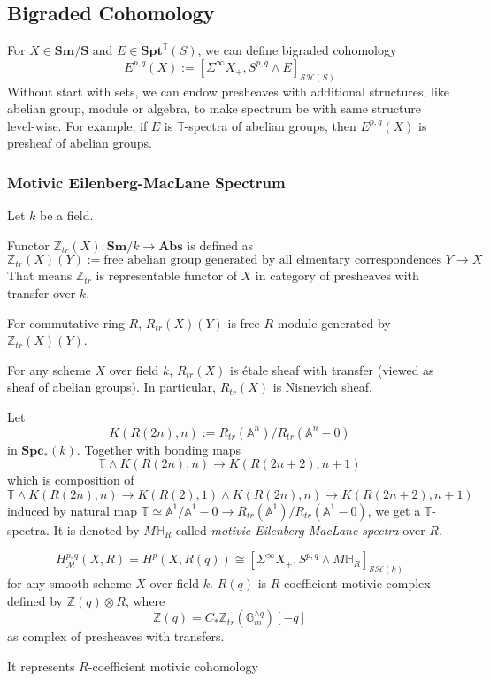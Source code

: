 \documentclass[b5paper,10pt]{article}
\begin{document}
\subsection{Bigraded Cohomology}
For $X \in \mathbf{Sm/S}$ and $E \in \mathbf{Spt}^{\mathbb{T}}(S)$, we can define bigraded cohomology
\[
E^{p,q}(X):= [\Sigma^{\infty}X_{+}, S^{p,q}\wedge E]_{\mathcal{SH}(S)}
\]
Without start with sets, we can endow presheaves with additional structures, like abelian group, module or algebra, to make spectrum be with same structure level-wise. For example, if $E$ is $\mathbb{T}$-spectra of abelian groups, then $E^{p,q}(X)$ is presheaf of abelian groups.
\subsubsection{Motivic Eilenberg-MacLane Spectrum}
Let $k$ be a field.
\begin{secdefn}
	Functor $\mathbb{Z}_{tr}(X) \colon \mathbf{Sm}/k \to \mathbf{Abs}$ is defined as
	\[
	\mathbb{Z}_{tr}(X)(Y) := \text{free abelian group generated by all elmentary correspondences } Y \to X
	\]
	That means $\mathbb{Z}_{tr}$ is representable functor of $X$ in category of presheaves with transfer over $k$.
	
	For commutative ring $R$, $R_{tr}(X)(Y)$ is free $R$-module generated by $\mathbb{Z}_{tr}(X)(Y)$.
\end{secdefn}
\begin{secprop}
	For any scheme $X$ over field $k$, $R_{tr}(X)$ is \'etale sheaf with transfer (viewed as sheaf of abelian groups). In particular, $R_{tr}(X)$ is Nisnevich sheaf.
\end{secprop}
Let 
\[
K(R(2n),n):= R_{tr}(\mathbb{A}^n)/R_{tr}(\mathbb{A}^n-0)
\]
in $\mathbf{Spc}_*(k)$. Together with bonding maps
\[
\mathbb{T} \wedge K(R(2n),n) \to K(R(2n+2),n+1)
\]
which is composition of 
\[
\mathbb{T} \wedge K(R(2n),n) \to K(R(2),1) \wedge K(R(2n),n) \to K(R(2n+2),n+1)
\]
induced by natural map $\mathbb{T} \simeq \mathbb{A}^1/\mathbb{A}^1-0 \to R_{tr}(\mathbb{A}^1)/R_{tr}(\mathbb{A}^1-0)$, we get a $\mathbb{T}$-spectra. It is denoted by $M\mathbb{H}_R$ called \emph{motivic Eilenberg-MacLane spectra} over $R$. 
\begin{secthm}
	\[
	H^{p,q}_\mathcal{M}(X,R)= H^p(X,R(q)) \cong [\Sigma^{\infty}X_{+}, S^{p,q}\wedge M\mathbb{H}_R]_{\mathcal{SH}(k)}
	\]
	for any smooth scheme $X$ over field $k$. $R(q)$ is $R$-coefficient motivic complex defined by $\mathbb{Z}(q) \otimes R$, where
	\[
	\mathbb{Z}(q) = C_* \mathbb{Z}_{tr}(\mathbb{G}_m^{\wedge q})[-q]
	\]
	as complex of presheaves with transfers.
\end{secthm}It represents $R$-coefficient motivic cohomology
\end{document}
